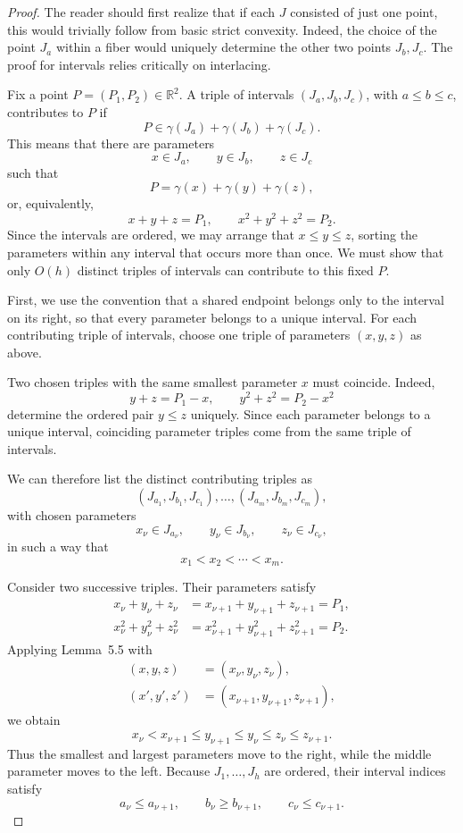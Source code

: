 \documentclass[10pt,a4paper]{amsart}
\begin{document}
\begin{proof}
The reader should first realize that if each $J$ consisted of just one point, this would trivially follow from basic strict convexity. Indeed, the choice of the point $J_a$ within a fiber would uniquely determine the other two points $J_b,J_c$. The proof for intervals relies critically on interlacing.

Fix a point $P=(P_1,P_2)\in\mathbb{R}^2$. A triple of intervals
$(J_a,J_b,J_c)$, with $a\le b\le c$, contributes to $P$ if
\[
    P\in\gamma(J_a)+\gamma(J_b)+\gamma(J_c).
\]
This means that there are parameters
\[
    x\in J_a,\qquad y\in J_b,\qquad z\in J_c
\]
such that
\[
    P=\gamma(x)+\gamma(y)+\gamma(z),
\]
or, equivalently,
\[
    x+y+z=P_1,\qquad x^2+y^2+z^2=P_2.
\]
Since the intervals are ordered, we may arrange that $x\le y\le z$,
sorting the parameters within any interval that occurs more than once.
We must show that only $O(h)$ distinct triples of intervals can
contribute to this fixed $P$.

First, we use the convention that a shared endpoint belongs only to the
interval on its right, so that every parameter belongs to a unique
interval. For each contributing triple of intervals, choose one triple
of parameters $(x,y,z)$ as above.

Two chosen triples with the same smallest parameter $x$ must coincide.
Indeed,
\[
    y+z=P_1-x,\qquad y^2+z^2=P_2-x^2
\]
determine the ordered pair $y\le z$ uniquely. Since each parameter
belongs to a unique interval, coinciding parameter triples come from
the same triple of intervals.

We can therefore list the distinct contributing triples as
\[
    (J_{a_1},J_{b_1},J_{c_1}),\ldots,
    (J_{a_m},J_{b_m},J_{c_m}),
\]
with chosen parameters
\[
    x_\nu\in J_{a_\nu},\qquad
    y_\nu\in J_{b_\nu},\qquad
    z_\nu\in J_{c_\nu},
\]
in such a way that
\[
    x_1<x_2<\cdots<x_m.
\]

Consider two successive triples. Their parameters satisfy
\[
\begin{aligned}
    x_\nu+y_\nu+z_\nu
    &=x_{\nu+1}+y_{\nu+1}+z_{\nu+1}=P_1,\\
    x_\nu^2+y_\nu^2+z_\nu^2
    &=x_{\nu+1}^2+y_{\nu+1}^2+z_{\nu+1}^2=P_2.
\end{aligned}
\]
Applying Lemma~5.5 with
\[
\begin{aligned}
    (x,y,z)&=(x_\nu,y_\nu,z_\nu),\\
    (x',y',z')&=(x_{\nu+1},y_{\nu+1},z_{\nu+1}),
\end{aligned}
\]
we obtain
\[
    x_\nu<x_{\nu+1}
    \le y_{\nu+1}\le y_\nu
    \le z_\nu\le z_{\nu+1}.
\]
Thus the smallest and largest parameters move to the right, while the
middle parameter moves to the left. Because $J_1,\ldots,J_h$ are
ordered, their interval indices satisfy
\[
    a_\nu\le a_{\nu+1},\qquad
    b_\nu\ge b_{\nu+1},\qquad
    c_\nu\le c_{\nu+1}.
\]


\end{proof}
\end{document}
